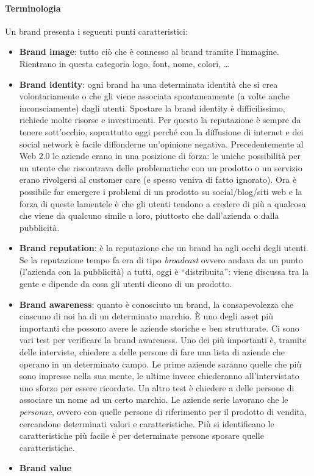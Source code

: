 \paragraph*{Terminologia} Un brand presenta i seguenti punti caratteristici:
\begin{itemize}
 \item \textbf{Brand image}: tutto ciò che è connesso al brand tramite
 l'immagine. Rientrano in questa categoria logo, font, nome, colori, \dots{}
 \item \textbf{Brand identity}: ogni brand ha una determinata identità che si
 crea volontariamente o che gli viene associata spontaneamente (a volte anche
 inconsciamente) dagli utenti.
 Spostare la brand identity è difficilissimo, richiede molte risorse e
 investimenti.
 Per questo la reputazione è sempre da tenere sott'occhio, soprattutto oggi
 perché con la diffusione di internet e dei social network è facile diffonderne
 un'opinione negativa.
 Precedentemente al Web 2.0 le aziende erano in una posizione di forza: le
 uniche possibilità per un utente che riscontrava delle problematiche con un
 prodotto o un servizio erano rivolgersi al customer care (e spesso veniva
 di fatto ignorato). Ora è possibile far emergere i problemi di un prodotto su
 social/blog/siti web e la forza di queste lamentele è che gli utenti tendono a
 credere di più a qualcosa che viene da qualcuno simile a loro, piuttosto che
 dall'azienda o dalla pubblicità.
 \item \textbf{Brand reputation}: è la reputazione che un brand ha agli occhi
 degli utenti. Se la reputazione tempo fa era di tipo \textit{broadcast} ovvero
 andava da un punto (l'azienda con la pubblicità) a tutti, oggi è
 ``distribuita'': viene discussa tra la gente e dipende da cosa gli utenti
 dicono di un prodotto.
 \item \textbf{Brand awareness}: quanto è conosciuto un brand, la
 consapevolezza che ciascuno di noi ha di un determinato marchio.
 È uno degli asset più importanti che possono avere le aziende storiche e ben
 strutturate.
 Ci sono vari test per verificare la brand awareness. Uno dei più importanti è,
 tramite delle interviste, chiedere a delle persone di fare una lista di
 aziende che operano in un determinato campo. Le prime aziende saranno quelle
 che più sono impresse nella sua mente, le ultime invece chiederanno
 all'intervistato uno sforzo per essere ricordate. Un altro test è chiedere a
 delle persone di associare un nome ad un certo marchio.
 Le aziende serie lavorano che le \textit{personae}, ovvero con quelle persone
 di riferimento per il prodotto di vendita, cercandone determinati valori e
 caratteristiche.
 Più si identificano le caratteristiche più facile è per determinate persone
 sposare quelle caratteristiche.
 \item \textbf{Brand value}
\end{itemize}
